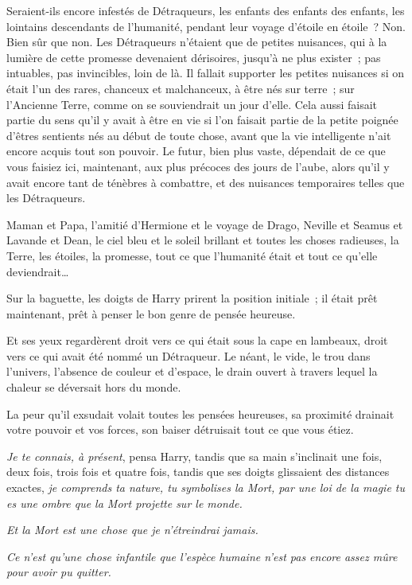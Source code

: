 Seraient-ils encore infestés de Détraqueurs, les enfants des enfants des enfants, les lointains descendants de l'humanité, pendant leur voyage d'étoile en étoile~? Non. Bien sûr que non. Les Détraqueurs n'étaient que de petites nuisances, qui à la lumière de cette promesse devenaient dérisoires, jusqu'à ne plus exister~; pas intuables, pas invincibles, loin de là. Il fallait supporter les petites nuisances si on était l'un des rares, chanceux et malchanceux, à être nés sur terre~; sur l'Ancienne Terre, comme on se souviendrait un jour d'elle. Cela aussi faisait partie du sens qu'il y avait à être en vie si l'on faisait partie de la petite poignée d'êtres sentients nés au début de toute chose, avant que la vie intelligente n'ait encore acquis tout son pouvoir. Le futur, bien plus vaste, dépendait de ce que vous faisiez ici, maintenant, aux plus précoces des jours de l'aube, alors qu'il y avait encore tant de ténèbres à combattre, et des nuisances temporaires telles que les Détraqueurs.

Maman et Papa, l'amitié d'Hermione et le voyage de Drago, Neville et Seamus et Lavande et Dean, le ciel bleu et le soleil brillant et toutes les choses radieuses, la Terre, les étoiles, la promesse, tout ce que l'humanité était et tout ce qu'elle deviendrait…

Sur la baguette, les doigts de Harry prirent la position initiale~; il était prêt maintenant, prêt à penser le bon genre de pensée heureuse.

Et ses yeux regardèrent droit vers ce qui était sous la cape en lambeaux, droit vers ce qui avait été nommé un Détraqueur. Le néant, le vide, le trou dans l'univers, l'absence de couleur et d'espace, le drain ouvert à travers lequel la chaleur se déversait hors du monde.

La peur qu'il exsudait volait toutes les pensées heureuses, sa proximité drainait votre pouvoir et vos forces, son baiser détruisait tout ce que vous étiez.

\emph{Je te connais, à présent}, pensa Harry, tandis que sa main s'inclinait une fois, deux fois, trois fois et quatre fois, tandis que ses doigts glissaient des distances exactes, \emph{je comprends ta nature, tu symbolises la Mort, par une loi de la magie tu es une ombre que la Mort projette sur le monde.}

\emph{Et la Mort est une chose que je n'étreindrai jamais.}

\emph{Ce n'est qu'une chose infantile que l'espèce humaine n'est pas encore assez mûre pour avoir pu quitter.}


